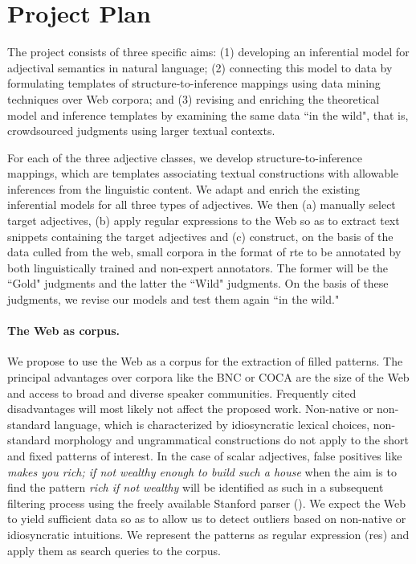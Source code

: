 \documentclass[10pt]{article}
\begin{document}
\section{Project Plan}



The project consists of three specific aims: (1) developing an inferential model for adjectival semantics in natural language; (2) connecting this model to data by formulating templates of structure-to-inference mappings using data mining techniques over Web corpora; and (3)
revising and enriching the  theoretical model and inference templates by examining the same data ``in the wild", that is,  crowdsourced judgments using larger textual contexts. 

For each of the three adjective classes, we develop structure-to-inference mappings, which are templates associating textual constructions with allowable inferences from the linguistic content. We adapt and enrich the existing inferential models for all three types of adjectives. We then (a) manually select target adjectives, (b) apply regular expressions to the Web so as to extract 
text snippets containing the target adjectives and (c) construct, on the basis of the data culled from the web, small corpora in the format of {\sc rte} 
to be annotated by both linguistically trained and non-expert annotators. The former will be the ``Gold" judgments and the latter the ``Wild" judgments. On the basis of these judgments, we revise our models and test them again ``in the wild." 

\paragraph{The Web as corpus.}
We propose to use the Web as a corpus for the extraction of filled patterns. 
The principal advantages over corpora like the BNC or COCA  are the size of the Web and access to broad and diverse speaker communities. 
Frequently cited disadvantages will most likely not affect the proposed work. Non-native or non-standard language, which is characterized by idiosyncratic lexical choices, 
non-standard morphology and ungrammatical constructions do not apply to the short and fixed patterns of interest. In the case of scalar adjectives, false positives 
like \textit{makes you rich; if not wealthy enough to build such a house} when the aim is to find the pattern \emph{rich if not wealthy} will be identified as such in 
a subsequent filtering process using the freely available Stanford parser (\cite{marneffe+maccartney+manning:2006}).
We expect the Web to yield sufficient data so as to allow us to detect outliers based on non-native or idiosyncratic intuitions. We represent the patterns as regular expression ({\sc re}s) and apply them as search queries to the corpus. 
\end{document}
